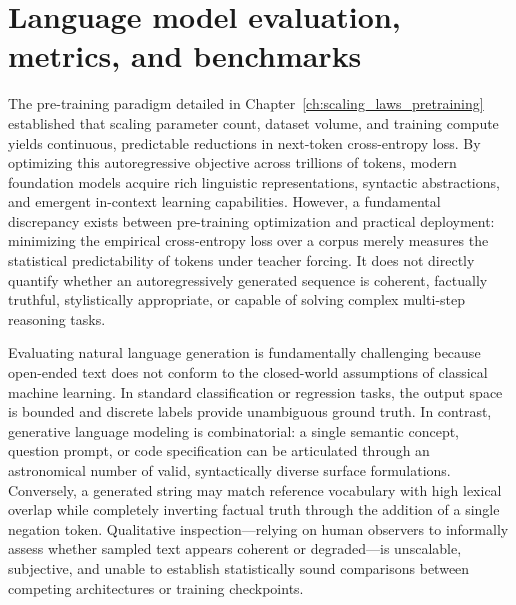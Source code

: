\documentclass[../../main.tex]{subfiles}
\begin{document}
\chapter{Language model evaluation, metrics, and benchmarks}
\label{ch:evaluation_metrics_benchmarks}

The pre-training paradigm detailed in Chapter~\ref{ch:scaling_laws_pretraining} established that scaling parameter count, dataset volume, and training compute yields continuous, predictable reductions in next-token cross-entropy loss. By optimizing this autoregressive objective across trillions of tokens, modern foundation models acquire rich linguistic representations, syntactic abstractions, and emergent in-context learning capabilities. However, a fundamental discrepancy exists between pre-training optimization and practical deployment: minimizing the empirical cross-entropy loss over a corpus merely measures the statistical predictability of tokens under teacher forcing. It does not directly quantify whether an autoregressively generated sequence is coherent, factually truthful, stylistically appropriate, or capable of solving complex multi-step reasoning tasks.

Evaluating natural language generation is fundamentally challenging because open-ended text does not conform to the closed-world assumptions of classical machine learning. In standard classification or regression tasks, the output space is bounded and discrete labels provide unambiguous ground truth. In contrast, generative language modeling is combinatorial: a single semantic concept, question prompt, or code specification can be articulated through an astronomical number of valid, syntactically diverse surface formulations. Conversely, a generated string may match reference vocabulary with high lexical overlap while completely inverting factual truth through the addition of a single negation token. Qualitative inspection---relying on human observers to informally assess whether sampled text appears coherent or degraded---is unscalable, subjective, and unable to establish statistically sound comparisons between competing architectures or training checkpoints.
\end{document}
